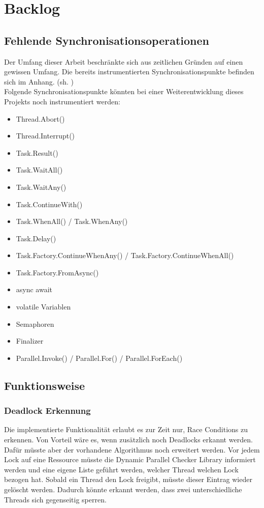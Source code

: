 \documentclass[10pt,a4paper]{article}
\begin{document}
\section{Backlog}
\subsection{Fehlende Synchronisationsoperationen}
Der Umfang dieser Arbeit beschränkte sich aus zeitlichen Gründen auf einen gewissen Umfang. Die bereits instrumentierten Synchronisationspunkte befinden sich im Anhang. (sh. )\\
Folgende Synchronisationspunkte könnten bei einer Weiterentwicklung dieses Projekts noch instrumentiert werden:
\begin{itemize}
\setlength\itemsep{0em}
\item Thread.Abort()
\item Thread.Interrupt()
\item Task.Result()
\item Task.WaitAll()
\item Task.WaitAny()
\item Task.ContinueWith()
\item Task.WhenAll() / Task.WhenAny()
\item Task.Delay()
\item Task.Factory.ContinueWhenAny() / Task.Factory.ContinueWhenAll()
\item Task.Factory.FromAsync()
\item async await
\item volatile Variablen
\item Semaphoren
\item Finalizer
\item Parallel.Invoke() / Parallel.For() / Parallel.ForEach()
\end{itemize}
\subsection{Funktionsweise}
\subsubsection*{Deadlock Erkennung}
Die implementierte Funktionalität erlaubt es zur Zeit nur, Race Conditions zu erkennen. Von Vorteil wäre es, wenn zusätzlich noch Deadlocks erkannt werden. Dafür müsste aber der vorhandene Algorithmus noch erweitert werden. Vor jedem Lock auf eine Ressource müsste die Dynamic Parallel Checker Library informiert werden und eine eigene Liste geführt werden, welcher Thread welchen Lock bezogen hat. Sobald ein Thread den Lock freigibt, müsste dieser Eintrag wieder gelöscht werden. Dadurch könnte erkannt werden, dass zwei unterschiedliche Threads sich gegenseitig sperren.
\end{document}
